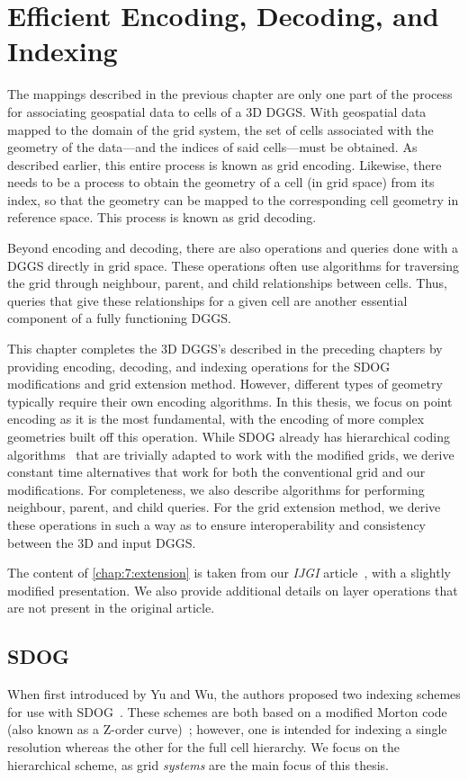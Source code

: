 \chapter{Efficient Encoding, Decoding, and Indexing} \label{chap:coding}
The mappings described in the previous chapter are only one part of the process for associating geospatial data to cells of a 3D DGGS.
With geospatial data mapped to the domain of the grid system, the set of cells associated with the geometry of the data---and the indices of said cells---must be obtained.
As described earlier, this entire process is known as grid encoding.
Likewise, there needs to be a process to obtain the geometry of a cell (in grid space) from its index, so that the geometry can be mapped to the corresponding cell geometry in reference space.
This process is known as grid decoding.


Beyond encoding and decoding, there are also operations and queries done with a DGGS directly in grid space.
These operations often use algorithms for traversing the grid through neighbour, parent, and child relationships between cells.
Thus, queries that give these relationships for a given cell are another essential component of a fully functioning DGGS.


This chapter completes the 3D DGGS's described in the preceding chapters by providing encoding, decoding, and indexing operations for the SDOG modifications and grid extension method.
However, different types of geometry typically require their own encoding algorithms.
In this thesis, we focus on point encoding as it is the most fundamental, with the encoding of more complex geometries built off this operation.
While SDOG already has hierarchical coding algorithms~\cite{yu2009sdog, yu2009coding} that are trivially adapted to work with the modified grids, we derive constant time alternatives that work for both the conventional grid and our modifications.
For completeness, we also describe algorithms for performing neighbour, parent, and child queries.
For the grid extension method, we derive these operations in such a way as to ensure interoperability and consistency between the 3D and input DGGS.


The content of \cref{chap:7:extension} is taken from our \textit{IJGI} article~\cite{ulmer2020general}, with a slightly modified presentation.
We also provide additional details on layer operations that are not present in the original article.


\section{SDOG}
When first introduced by Yu and Wu, the authors proposed two indexing schemes for use with SDOG~\cite{yu2009coding}.
These schemes are both based on a modified Morton code (also known as a Z-order curve)~\cite{morton1966computer}; however, one is intended for indexing a single resolution whereas the other for the full cell hierarchy.
We focus on the hierarchical scheme, as grid \textit{systems} are the main focus of this thesis.


